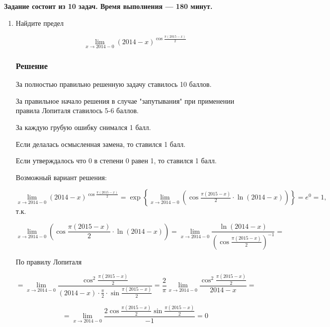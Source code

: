 \documentclass[pdftex,12pt,a4paper]{article}
\begin{document}
\newcommand{\solution}{\subsubsection*{Решение}}

\begin{center}
\textbf{Задание состоит из 10 задач. Время выполнения --- 180 минут.}
\end{center}

\vspace{40pt}




\begin{enumerate}



\item Найдите предел

\[
\lim_{x\to 2014-0} (2014-x)^{\cos \frac{\pi (2015-x)}{2} } 
\]



\solution

За полностью правильно решенную задачу ставилось 10 баллов.

За правильное начало решения в случае "запутывания" при применении правила Лопиталя ставилось 5-6 баллов.

За каждую грубую ошибку снимался 1 балл.

Если делалась осмысленная замена, то ставился 1 балл.

Если утверждалось что 0 в степени 0 равен 1, то ставился 1 балл.

Возможный вариант решения:

$\mathop{\lim }\limits_{x\to 2014-0} (2014-x)^{\cos \frac{\pi (2015-x)}{2} } =\exp \left\{\mathop{\lim }\limits_{x\to 2014-0} \left(\cos \frac{\pi (2015-x)}{2} \cdot \ln (2014-x)\right)\right\}=e^{0} =1,$ т.к.

\[\mathop{\lim }\limits_{x\to 2014-0} \left(\cos \frac{\pi (2015-x)}{2} \cdot \ln (2014-x)\right)=\mathop{\lim }\limits_{x\to 2014-0} \frac{\ln (2014-x)}{\left(\cos \frac{\pi (2015-x)}{2} \right)^{-1} } =\] 

По правилу Лопиталя

\[=\mathop{\lim }\limits_{x\to 2014-0} \frac{\cos ^{2} \frac{\pi (2015-x)}{2} }{(2014-x)\cdot \frac{\pi }{2} \cdot \sin \frac{\pi (2015-x)}{2} } =\frac{2}{\pi } \mathop{\lim }\limits_{x\to 2014-0} \frac{\cos ^{2} \frac{\pi (2015-x)}{2} }{2014-x} =\] 

\[=\mathop{\lim }\limits_{x\to 2014-0} \frac{2\cos \frac{\pi (2015-x)}{2} \sin \frac{\pi (2015-x)}{2} }{-1} =0\] 




\end{enumerate}
\end{document}
